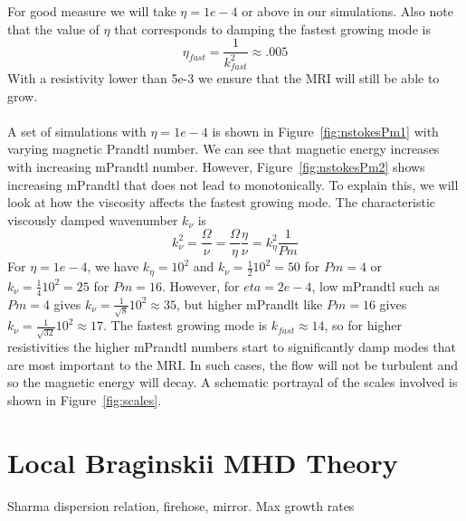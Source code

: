 For good measure we will take $\eta=1e-4$ or above in our simulations. Also note that the value of $\eta$ that corresponds to damping the fastest growing mode is
\begin{equation*}
  \eta_{fast}=\frac1{k^2_{fast}}\approx .005
\end{equation*}
With a resistivity lower than 5e-3 we ensure that the MRI will still be able to grow.\\
\\
A set of simulations with $\eta=1e-4$ is shown in Figure~\ref{fig:nstokesPm1} with varying magnetic Prandtl number. We can see that magnetic energy increases with increasing mPrandtl number. However, Figure~\ref{fig:nstokesPm2} shows increasing mPrandtl that does not lead to monotonically. To explain this, we will look at how the viscosity affects the fastest growing mode. The characteristic viscously damped wavenumber $k_\nu$ is
\begin{equation*}
  k_\nu^2=\frac\Omega\nu=\frac\Omega\eta\frac\eta\nu=k_\eta^2\frac1{Pm}
\end{equation*}
For $\eta=1e-4$, we have $k_\eta=10^2$ and $k_\nu=\frac1210^2=50$ for $Pm=4$ or $k_\nu=\frac1410^2=25$ for $Pm=16$. However, for $eta=2e-4$, low mPrandtl such as $Pm=4$ gives $k_\nu=\frac1{\sqrt{8}}10^2\approx35$, but higher mPrandlt like $Pm=16$ gives $k_\nu=\frac1{\sqrt{32}}10^2\approx17$. The fastest growing mode is $k_{fast}\approx 14$, so for higher resistivities the higher mPrandtl numbers start to significantly damp modes that are most important to the MRI. In such cases, the flow will not be turbulent and so the magnetic energy will decay. A schematic portrayal of the scales involved is shown in Figure~\ref{fig:scales}.

\section{Local Braginskii MHD Theory}
Sharma dispersion relation, firehose, mirror. Max growth rates





